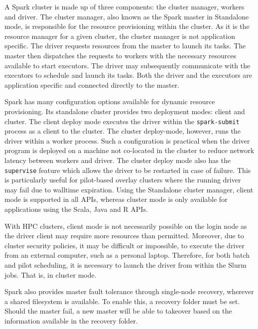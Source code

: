 \documentclass{IEEEtran}
\begin{document}
    A Spark cluster is made up of three components: the cluster manager, workers and
    driver. The cluster manager, also known as the Spark master in Standalone mode, is responsible for the
    resource provisioning within the cluster.  As it is the resource manager for a given cluster,
    the cluster manager is not application specific. The driver requests resources from the master
    to launch its tasks. The master then dispatches the requests to workers with
    the necessary resources available to start
    executors. The driver may subsequently communicate with the executors to schedule and launch its tasks. Both the driver and
    the executors are application specific and connected directly to the master. 

    Spark has many configuration options available for dynamic resource provisioning.
    Its standalone cluster provides two deployment modes: client and cluster. The client
    deploy mode executes the driver within the \texttt{spark-submit} process as
    a client to the cluster. The cluster deploy-mode, however, runs the driver within
    a worker process. Such a configuration is practical when the driver program
    is deployed on a machine not co-located in the cluster to reduce network 
    latency between workers and driver. The cluster deploy mode also has the \texttt{supervise}
    feature which allows the driver to be restarted in case of failure.
    This is particularly useful for
    pilot-based overlay clusters where the running driver may fail due to walltime expiration.
    Using the Standalone cluster manager, client mode is supported in all APIs, whereas cluster mode is
    only available for applications using the Scala, Java and R APIs.

    With HPC clusters, client mode is not necessarily possible on the login node as the
    driver client may require more resources than permitted. Moreover, due to cluster
    security policies, it may be difficult or impossible, to execute the driver from
    an external computer, such as a personal laptop. Therefore, for both batch and pilot
    scheduling, it is necessary to launch the driver from within the Slurm jobs. That is, in cluster mode.

    Spark also provides master fault tolerance through single-node recovery, wherever a shared
    filesystem is available. To enable this, a recovery folder must be set. Should the master
    fail, a new master will be able to takeover based on the information available in the recovery
    folder.
\end{document}
